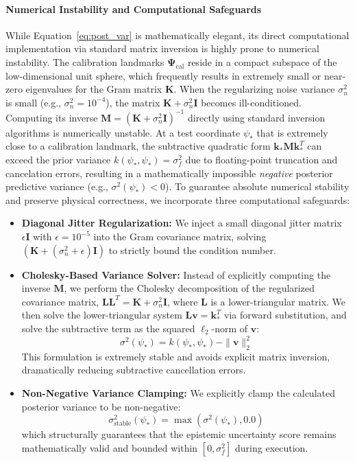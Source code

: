 \paragraph{Numerical Instability and Computational Safeguards}
While Equation~\ref{eq:post_var} is mathematically elegant, its direct computational implementation via standard matrix inversion is highly prone to numerical instability. The calibration landmarks $\mathbf{\Psi}_{\text{cal}}$ reside in a compact subspace of the low-dimensional unit sphere, which frequently results in extremely small or near-zero eigenvalues for the Gram matrix $\mathbf{K}$. When the regularizing noise variance $\sigma_n^2$ is small (e.g., $\sigma_n^2 = 10^{-4}$), the matrix $\mathbf{K} + \sigma_n^2 \mathbf{I}$ becomes ill-conditioned. Computing its inverse $\mathbf{M} = (\mathbf{K} + \sigma_n^2 \mathbf{I})^{-1}$ directly using standard inversion algorithms is numerically unstable. At a test coordinate $\psi_*$ that is extremely close to a calibration landmark, the subtractive quadratic form $\mathbf{k}_* \mathbf{M} \mathbf{k}_*^T$ can exceed the prior variance $k(\psi_*, \psi_*) = \sigma_f^2$ due to floating-point truncation and cancelation errors, resulting in a mathematically impossible \emph{negative} posterior predictive variance (e.g., $\sigma^2(\psi_*) < 0$). To guarantee absolute numerical stability and preserve physical correctness, we incorporate three computational safeguards:
\begin{itemize}
    \item \textbf{Diagonal Jitter Regularization:} We inject a small diagonal jitter matrix $\epsilon \mathbf{I}$ with $\epsilon = 10^{-5}$ into the Gram covariance matrix, solving $(\mathbf{K} + (\sigma_n^2 + \epsilon) \mathbf{I})$ to strictly bound the condition number.
    \item \textbf{Cholesky-Based Variance Solver:} Instead of explicitly computing the inverse $\mathbf{M}$, we perform the Cholesky decomposition of the regularized covariance matrix, $\mathbf{L} \mathbf{L}^T = \mathbf{K} + \sigma_n^2 \mathbf{I}$, where $\mathbf{L}$ is a lower-triangular matrix. We then solve the lower-triangular system $\mathbf{L} \mathbf{v} = \mathbf{k}_*^T$ via forward substitution, and solve the subtractive term as the squared $\ell_2$-norm of $\mathbf{v}$:
    \begin{equation}
    \sigma^2(\psi_*) = k(\psi_*, \psi_*) - \|\mathbf{v}\|_2^2
    \end{equation}
    This formulation is extremely stable and avoids explicit matrix inversion, dramatically reducing subtractive cancellation errors.
    \item \textbf{Non-Negative Variance Clamping:} We explicitly clamp the calculated posterior variance to be non-negative:
    \begin{equation}
    \sigma_{\text{stable}}^2(\psi_*) = \max\left( \sigma^2(\psi_*), 0.0 \right)
    \end{equation}
    which structurally guarantees that the epistemic uncertainty score remains mathematically valid and bounded within $[0, \sigma_f^2]$ during execution.
\end{itemize}

